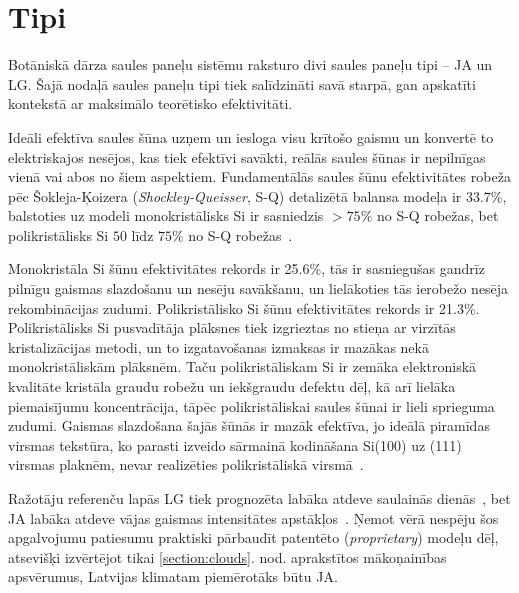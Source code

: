 
\section{Tipi} \label{section:tipi}


Botāniskā dārza saules paneļu sistēmu raksturo divi saules paneļu tipi -- JA un LG. Šajā nodaļā saules paneļu tipi tiek salīdzināti savā starpā, gan apskatīti kontekstā ar maksimālo teorētisko efektivitāti.

Ideāli efektīva saules šūna uzņem un iesloga visu krītošo gaismu un 
konvertē to elektriskajos nesējos, kas tiek efektīvi savākti, reālās saules šūnas ir nepilnīgas vienā vai abos no šiem aspektiem. Fundamentālās saules šūnu efektivitātes robeža pēc Šokleja-Ķoizera (\textit{Shockley-Queisser}, S-Q) detalizētā balansa modeļa ir 33.7\%, balstoties uz modeli monokristālisks Si ir sasniedzis $>75\%$ no S-Q robežas, bet polikristālisks Si $50$ līdz $75\%$ no S-Q robežas~\cite{polman2016}.

Monokristāla Si šūnu efektivitātes rekords ir 25.6\%, tās ir sasniegušas gandrīz pilnīgu gaismas slazdošanu un nesēju savākšanu, un lielākoties tās ierobežo nesēja rekombinācijas zudumi. Polikristālisko Si šūnu efektivitātes rekords ir 21.3\%.
Polikristālisks Si pusvadītāja plāksnes tiek izgrieztas no stieņa ar virzītās kristalizācijas metodi, un to izgatavošanas izmaksas ir mazākas nekā monokristāliskām plāksnēm. Taču polikristāliskam Si ir zemāka elektroniskā kvalitāte kristāla graudu robežu un iekšgraudu defektu dēļ, kā arī lielāka piemaisījumu koncentrācija, tāpēc polikristāliskai saules šūnai ir lieli sprieguma zudumi. Gaismas slazdošana šajās šūnās ir mazāk efektīva, jo ideālā piramīdas virsmas tekstūra, ko parasti izveido sārmainā kodināšana Si(100) uz (111) virsmas plaknēm, nevar realizēties polikristāliskā virsmā~\cite{polman2016}.

Ražotāju referenču lapās LG tiek prognozēta labāka atdeve saulainās dienās~\cite{LGtips}, bet JA labāka atdeve vājas gaismas intensitātes apstākļos~\cite{JAtips}. Ņemot vērā nespēju šos apgalvojumu patiesumu praktiski pārbaudīt patentēto (\textit{proprietary}) modeļu dēļ, atsevišķi izvērtējot tikai \ref{section:clouds}. nod. aprakstītos mākoņainības apsvērumus, Latvijas klimatam piemērotāks būtu JA.

